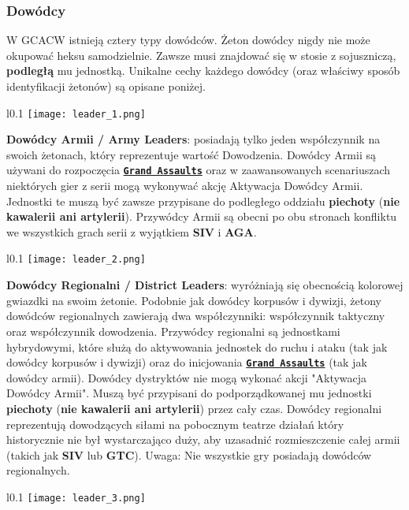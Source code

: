 \subsubsection*{Dowódcy}
W GCACW istnieją cztery typy dowódców. Żeton dowódcy nigdy nie może okupować heksu samodzielnie. Zawsze musi znajdować się w stosie z sojuszniczą, \textbf{podległą} mu jednostką. Unikalne cechy każdego dowódcy (oraz właściwy sposób identyfikacji żetonów) są opisane poniżej.\par
\begin{wrapfigure}{l}{0.1\textwidth}
    \texttt{[image: leader\_1.png]}
\end{wrapfigure}
\textbf{Dowódcy Armii / Army Leaders}: posiadają tylko jeden współczynnik na swoich żetonach, który reprezentuje wartość Dowodzenia. Dowódcy Armii są używani do rozpoczęcia \textbf{\texttt{\underline {Grand Assaults}}} oraz w zaawansowanych scenariuszach niektórych gier z serii mogą wykonywać akcję Aktywacja Dowódcy Armii. Jednostki te muszą być zawsze przypisane do podległego oddziału \textbf{piechoty} (\textbf{nie kawalerii ani artylerii}). Przywódcy Armii są obecni po obu stronach konfliktu we wszystkich grach serii z wyjątkiem \textbf{SIV} i \textbf{AGA}.\par
\begin{wrapfigure}{l}{0.1\textwidth}
    \texttt{[image: leader\_2.png]}
\end{wrapfigure}
\textbf{Dowódcy Regionalni / District Leaders}: wyróżniają się obecnością kolorowej gwiazdki na swoim żetonie. Podobnie jak dowódcy korpusów i dywizji, żetony dowódców regionalnych zawierają dwa współczynniki: współczynnik taktyczny oraz współczynnik dowodzenia. Przywódcy regionalni są jednostkami hybrydowymi, które służą do aktywowania jednostek do ruchu i ataku (tak jak dowódcy korpusów i dywizji) oraz do inicjowania \textbf{\texttt{\underline {Grand Assaults}}} (tak jak dowódcy armii). Dowódcy dystryktów nie mogą wykonać akcji "Aktywacja Dowódcy Armii". Muszą być przypisani do podporządkowanej mu jednostki \textbf{piechoty} (\textbf{nie kawalerii ani artylerii}) przez cały czas. Dowódcy regionalni reprezentują dowodzących siłami na pobocznym teatrze działań który historycznie nie był wystarczająco duży, aby uzasadnić rozmieszczenie całej armii (takich jak \textbf{SIV} lub \textbf{GTC}). Uwaga: Nie wszystkie gry posiadają dowódców regionalnych.\par
\begin{wrapfigure}{l}{0.1\textwidth}
    \texttt{[image: leader\_3.png]}
\end{wrapfigure}

